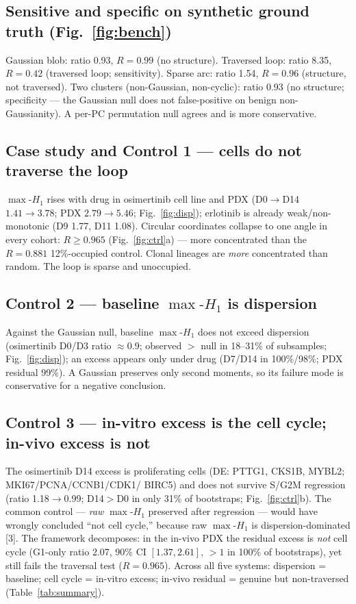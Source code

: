 \documentclass[11pt,a4paper]{article}
\newcommand{\maxh}{\ensuremath{\max\text{-}H_1}}
\begin{document}
\subsection*{Sensitive and specific on synthetic ground truth (Fig.~\ref{fig:bench})}
Gaussian blob: ratio 0.93, $R=0.99$ (no structure). Traversed loop: ratio 8.35, $R=0.42$ (traversed
loop; sensitivity). Sparse arc: ratio 1.54, $R=0.96$ (structure, not traversed). Two clusters
(non-Gaussian, non-cyclic): ratio 0.93 (no structure; specificity --- the Gaussian null does not
false-positive on benign non-Gaussianity). A per-PC permutation null agrees and is more
conservative.

\subsection*{Case study and Control 1 --- cells do not traverse the loop}
\maxh{} rises with drug in osimertinib cell line and PDX (D0$\to$D14 $1.41\to3.78$; PDX
$2.79\to5.46$; Fig.~\ref{fig:disp}); erlotinib is already weak/non-monotonic (D9 1.77, D11 1.08).
Circular coordinates collapse to one angle in every cohort: $R\ge0.965$ (Fig.~\ref{fig:ctrl}a) ---
more concentrated than the $R=0.881$ 12\%-occupied control. Clonal lineages are \emph{more}
concentrated than random. The loop is sparse and unoccupied.

\subsection*{Control 2 --- baseline \maxh{} is dispersion}
Against the Gaussian null, baseline \maxh{} does not exceed dispersion (osimertinib D0/D3 ratio
$\approx0.9$; observed $>$ null in 18--31\% of subsamples; Fig.~\ref{fig:disp}); an excess appears
only under drug (D7/D14 in 100\%/98\%; PDX residual 99\%). A Gaussian preserves only second
moments, so its failure mode is conservative for a negative conclusion.

\subsection*{Control 3 --- in-vitro excess is the cell cycle; in-vivo excess is not}
The osimertinib D14 excess is proliferating cells (DE: PTTG1, CKS1B, MYBL2; MKI67/PCNA/CCNB1/CDK1/
BIRC5) and does not survive S/G2M regression (ratio 1.18$\to$0.99; D14$>$D0 in only 31\% of
bootstraps; Fig.~\ref{fig:ctrl}b). The common control --- \emph{raw} \maxh{} preserved after
regression --- would have wrongly concluded ``not cell cycle,'' because raw \maxh{} is
dispersion-dominated [3]. The framework decomposes: in the in-vivo PDX the residual excess is
\emph{not} cell cycle (G1-only ratio 2.07, 90\% CI $[1.37,2.61]$, $>1$ in 100\% of bootstraps), yet
still fails the traversal test ($R=0.965$). Across all five systems: dispersion = baseline; cell
cycle = in-vitro excess; in-vivo residual = genuine but non-traversed (Table~\ref{tab:summary}).
\end{document}
